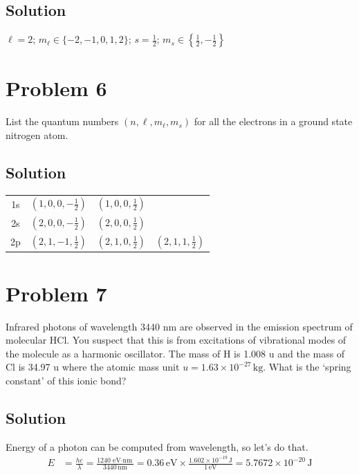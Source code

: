 \documentclass[12pt]{report}
\newcommand{\E}[1]{\times 10^{#1}}
\begin{document}
    \subsection*{Solution}
        $\ell = 2$; $m_\ell \in \{-2, -1, 0, 1, 2\}$; $s = \frac{1}{2}$; $m_s \in \left\{ \frac{1}{2}, -\frac{1}{2} \right\}$

\section*{Problem 6}
    List the quantum numbers $(n, \ell, m_\ell, m_s)$ for all the electrons in a ground state nitrogen atom.

    \subsection*{Solution}
        \begin{tabular}{c | c c c}
            1s & $(1, 0, 0, -\frac{1}{2})$ & $(1, 0, 0, \frac{1}{2})$ &\\
            2s & $(2, 0, 0, -\frac{1}{2})$ & $(2, 0, 0, \frac{1}{2})$ &\\
            2p & $(2, 1, -1, \frac{1}{2})$ & $(2, 1, 0, \frac{1}{2})$ & $(2, 1, 1, \frac{1}{2})$
        \end{tabular}

\section*{Problem 7}
    Infrared photons of wavelength 3440 nm are observed in the emission spectrum of molecular HCl. 
    You suspect that this is from excitations of vibrational modes of the molecule as a harmonic oscillator. 
    The mass of H is 1.008 u and the mass of Cl is 34.97 u where the atomic mass unit $u = 1.63\E{-27}\,\unit{\kilo\gram}$. 
    What is the `spring constant' of this ionic bond? %

    \subsection*{Solution}
        Energy of a photon can be computed from wavelength, so let's do that. 
        \begin{align*}
            E   &=  \frac{hc}{\lambda}
                =   \frac{1240\,\unit{\eV\cdot\nano\meter}}{3440\,\unit{\nano\meter}}
                =   0.36\,\unit{\eV} \times \frac{1.602\E{-19}\,\unit{\joule}}{1\,\unit{\eV}}
                =   5.7672\E{-20}\,\unit{\joule}
        \end{align*}
\end{document}
